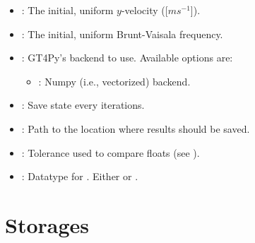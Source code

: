 \documentclass[letterpaper,10pt,english]{sphinxmanual}
\begin{document}
\begin{description}
\begin{itemize}
\item {} 
: The initial, uniform \(y\)-velocity ({[}\(m s^{-1}\){]}).

\item {} 
: The initial, uniform Brunt-Vaisala frequency.

\item {} 
: GT4Py’s backend to use. Available options are:
\begin{itemize}
\item {} 
: Numpy (i.e., vectorized) backend.

\end{itemize}

\item {} 
: Save state every  iterations.

\item {} 
: Path to the location where results should be saved.

\item {} 
: Tolerance used to compare floats (see {\hyperref[\detokenize{api:module-utils}]{}}).

\item {} 
: Datatype for . Either              or .

\end{itemize}

\end{description}


\section{Storages}
\label{\detokenize{api:storages}}
\end{document}
